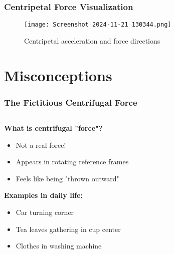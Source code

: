 \documentclass{beamer}
\begin{document}
\begin{frame}
\frametitle{Centripetal Force Visualization}
\begin{figure}
    \centering
    \texttt{[image: Screenshot 2024-11-21 130344.png]}
    \caption{Centripetal acceleration and force directions}
\end{figure}
\end{frame}

\section{Misconceptions}

\begin{frame}
\frametitle{The Fictitious Centrifugal Force}

\begin{columns}[T]
\begin{column}{0.6\textwidth}
\textbf{What is centrifugal "force"?}
\pause
\begin{itemize}
    \item Not a real force!
    \pause
    \item Appears in rotating reference frames
    \pause
    \item Feels like being "thrown outward"
\end{itemize}

\pause
\textbf{Examples in daily life:}
\begin{itemize}
    \item Car turning corner
    \pause
    \item Tea leaves gathering in cup center
    \pause
    \item Clothes in washing machine
\end{itemize}
\end{column}

\begin{column}{0.4\textwidth}
\end{column}
\end{columns}
\end{frame}
\end{document}
